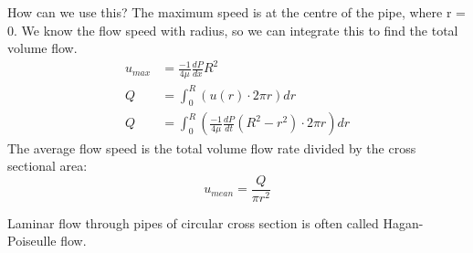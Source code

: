\documentclass[class=report, crop=false, 12pt,a4paper]{standalone}
\begin{document}
How can we use this? The maximum speed is at the centre of the pipe, where r = 0. We know the flow speed with radius, so we can integrate this to find the total volume flow.
\begin{align}
  u_{max} &= \frac{-1}{4\mu}\frac{dP}{dx} R^2\\
  Q &= \int^R_0 \left( u(r)\cdot 2\pi r \right) dr\\
  Q &= \int^R_0 \left( \frac{-1}{4\mu} \frac{dP}{dt}(R^2 - r^2) \cdot 2\pi r \right) dr 
\end{align}
The average flow speed is the total volume flow rate divided by the cross sectional area:
\begin{equation} 
  u_{mean} = \frac{Q}{\pi r^2}
\end{equation}
\begin{center}
  Laminar flow through pipes of circular cross section is often called Hagan-Poiseulle flow.
\end{center}
\end{document}
